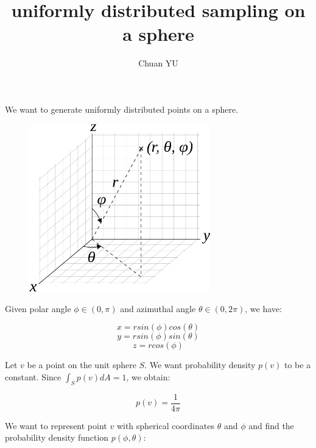 \documentclass{article}
\title{uniformly distributed sampling on a sphere}
\author{Chuan YU}
\date{}
\begin{document}
\maketitle

\setlength{\parindent}{0pt}
We want to generate uniformly distributed points on a sphere.
\begin{figure}[H]
    \centering 
    \includegraphics[width=0.7\textwidth]{figure1.png} 
\end{figure}

Given polar angle $\phi \in (0, \pi)$ and azimuthal angle $\theta \in (0, 2\pi)$, we have:

$$x = rsin(\phi)cos(\theta)$$
$$y = rsin(\phi)sin(\theta)$$
$$z = rcos(\phi)$$

Let $v$ be a point on the unit sphere $S$. We want probability density $p(v)$ to be a constant. Since $\int_S p(v) dA = 1$, we obtain:

$$p(v) = \frac{1}{4\pi}$$

We want to represent point $v$ with spherical coordinates $\theta$ and $\phi$ and find the probability density function $p(\phi, \theta)$:
\end{document}
